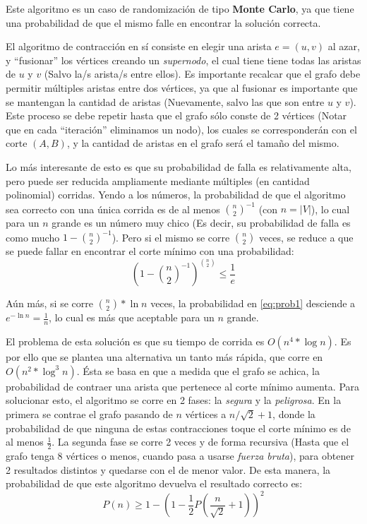 \documentclass[a4paper,10pt]{article}
\begin{document}
Este algoritmo es un caso de randomización de tipo \textbf{Monte Carlo}, ya que tiene una probabilidad de que el mismo falle en encontrar la solución correcta.

El algoritmo de contracción en sí consiste en elegir una arista $e=(u,v)$ al azar, y “fusionar” los vértices creando un \textit{supernodo}, el cual tiene tiene todas las aristas de $u$ y $v$ (Salvo la/s arista/s entre ellos). Es importante recalcar que el grafo debe permitir múltiples aristas entre dos vértices, ya que al fusionar es importante que se mantengan la cantidad de aristas (Nuevamente, salvo las que son entre $u$ y $v$). Este proceso se debe repetir hasta que el grafo sólo conste de 2 vértices (Notar que en cada ``iteración'' eliminamos un nodo), los cuales se corresponderán con el corte $(A,B)$, y la cantidad de aristas en el grafo será el tamaño del mismo.

Lo más interesante de esto es que su probabilidad de falla es relativamente alta, pero puede ser reducida ampliamente mediante múltiples (en cantidad polinomial) corridas. Yendo a los números, la probabilidad de que el algoritmo sea correcto con una única corrida es de al menos ${\binom{n}{2}}^{-1}$ (con $n = |V|$), lo cual para un $n$ grande es un número muy chico (Es decir, su probabilidad de falla es como mucho $1 - {\binom{n}{2}}^{-1}$). Pero si el mismo se corre $\binom{n}{2}$ veces, se reduce a que se puede fallar en encontrar el corte mínimo con una probabilidad:
\begin{equation}
	\label{eq:prob1}
	\tag{2.1}
	(1 - {\binom{n}{2}}^{-1})^{\binom{n}{2}} \leq \frac{1}{e}
\end{equation}

Aún más, si se corre $\binom{n}{2}*\ln n$ veces, la probabilidad en \ref{eq:prob1} desciende a $e^{-\ln n} = \frac{1}{n}$, lo cual es más que aceptable para un $n$ grande.

El problema de esta solución es que su tiempo de corrida es $O(n^4*\log n)$. Es por ello que se plantea una alternativa un tanto más rápida, que corre en $O(n^2*\log^3 n)$. Ésta se basa en que a medida que el grafo se achica, la probabilidad de contraer una arista que pertenece al corte mínimo aumenta. Para solucionar esto, el algoritmo se corre en 2 fases: la \textit{segura} y la \textit{peligrosa}. En la primera se contrae el grafo pasando de $n$ vértices a $n / \sqrt{2} + 1$, donde la probabilidad de que ninguna de estas contracciones toque el corte mínimo es de al menos $\frac{1}{2}$. La segunda fase se corre 2 veces y de forma recursiva (Hasta que el grafo tenga 8 vértices o menos, cuando pasa a usarse \textit{fuerza bruta}), para obtener 2 resultados distintos y quedarse con el de menor valor. De esta manera, la probabilidad de que este algoritmo devuelva el resultado correcto es:
\begin{equation}
	\label{eq:prob2}
	\tag{2.2}
	P(n) \geq 1 - (1 - \frac{1}{2} P(\frac{n}{\sqrt{2}} + 1))^2
\end{equation}
\end{document}
